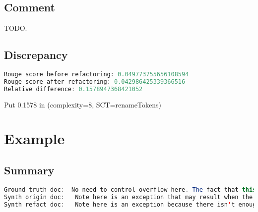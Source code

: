 \documentclass[11pt]{article}
\begin{document}
  \subsection{Comment}

  TODO.

  \subsection{Discrepancy}

  \begin{lstlisting}[language=java]
Rouge score before refactoring: 0.049773755656108594
Rouge score after refactoring: 0.042986425339366516
Relative difference: 0.1578947368421052
  \end{lstlisting}

  Put 0.1578 in (complexity=8, SCT=renameTokens)

  \pagebreak
  \section{Example}
  \subsection{Summary}

  \begin{lstlisting}[language=java]
Ground truth doc:  No need to control overflow here. The fact that this has overflow will be used as a flag to determine
Synth origin doc:   Note here is an exception that may result when the writer checks whether there exist problems or otherwise to
Synth refact doc:   Note here is an exception because there isn't enough logic in it and thus no assumption made there
  \end{lstlisting}
\end{document}
